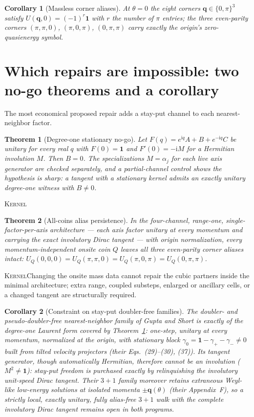 \documentclass[11pt]{article}
\newcommand{\ii}{\mathrm{i}}
\newcommand{\id}{\mathbf{1}}
\newcommand{\Kernel}{\textcolor{kernelcolor}{\textsc{Kernel}}}
\newtheorem{theorem}{Theorem}
\newtheorem{corollary}{Corollary}
\begin{document}
\begin{corollary}[Massless corner aliases]\label{cor:aliases}
At $\theta=0$ the eight corners $\mathbf q\in\{0,\pi\}^3$ satisfy
$U(\mathbf q,0)=(-1)^{r}\id$ with $r$ the number of $\pi$ entries; the
three even-parity corners $(\pi,\pi,0)$, $(\pi,0,\pi)$, $(0,\pi,\pi)$ carry
exactly the origin's zero-quasienergy symbol.
\end{corollary}

\section{Which repairs are impossible: two no-go theorems and a corollary}
\label{sec:nogo}

The most economical proposed repair adds a stay-put channel to each
nearest-neighbor factor.

\begin{theorem}[Degree-one stationary no-go]\label{thm:stationary}
Let $F(q)=e^{\ii q}A+B+e^{-\ii q}C$ be unitary for every real $q$ with
$F(0)=\id$ and $F'(0)=-\ii M$ for a Hermitian involution $M$.  Then $B=0$.
The specializations $M=\alpha_j$ for each live axis generator are checked
separately, and a partial-channel control shows the hypothesis is sharp: a
tangent with a stationary kernel admits an exactly unitary degree-one
witness with $B\neq0$.
\end{theorem}
\noindent\Kernel{}

\begin{theorem}[All-coins alias persistence]\label{thm:allcoins}
In the four-channel, range-one, single-factor-per-axis architecture ---
each axis factor unitary at every momentum and carrying the exact
involutory Dirac tangent --- with origin normalization, every
momentum-independent onsite coin $Q$ leaves all
three even-parity corner aliases intact:
$U_Q(0,0,0)=U_Q(\pi,\pi,0)=U_Q(\pi,0,\pi)=U_Q(0,\pi,\pi)$.
\end{theorem}
\noindent\Kernel{}\quad Changing the onsite mass data cannot repair the
cubic partners inside the minimal architecture; extra range, coupled
substeps, enlarged or ancillary cells, or a changed tangent are structurally
required.

\begin{corollary}[Constraint on stay-put doubler-free families]
\label{cor:gs}
The doubler- and pseudo-doubler-free nearest-neighbor family of Gupta and
Short \cite{GuptaShortDoubling} is exactly of the degree-one Laurent form
covered by Theorem~\ref{thm:stationary}: one-step, unitary at every
momentum, normalized at the origin, with stationary block
$\gamma_0=\id-\gamma_+-\gamma_-\neq0$ built from tilted velocity projectors
(their Eqs.~(29)--(30), (37)).  Its tangent generator, though automatically
Hermitian, therefore cannot be an involution ($M^2\neq\id$): stay-put
freedom is purchased exactly by relinquishing the involutory unit-speed
Dirac tangent.  Their $3+1$ family moreover retains extraneous Weyl-like
low-energy solutions at isolated momenta $\pm\mathbf q(\theta)$ (their
Appendix~F), so a strictly local, exactly unitary, fully alias-free $3+1$
walk with the complete involutory Dirac tangent remains open in both
programs.
\end{corollary}
\end{document}
